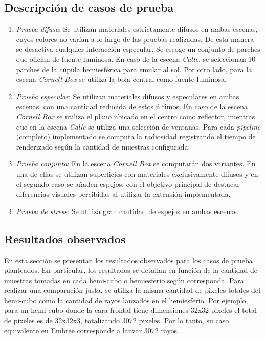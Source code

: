 \subsection{Descripción de casos de prueba}

\begin{enumerate}
	\item \textit{Prueba difusa}: Se utilizan materiales estrictamente difusos en ambas escenas, cuyos colores no varían a lo largo de las pruebas realizadas. De esta manera se desactiva cualquier interacción especular. Se escoge un conjunto de parches que ofician de fuente luminosa. En caso de la escena \textit{Calle}, se seleccionan 10 parches de la cúpula hemiesférica para emular al sol. Por otro lado, para la escena \textit{Cornell Box} se utiliza la bola central como fuente luminosa.
	\item \textit{Prueba especular}: Se utilizan materiales difusos y especulares en ambas escenas, con una cantidad reducida de estos últimos. En caso de la escena \textit{Cornell Box} se utiliza el plano ubicado en el centro como reflector, mientras que en la escena \textit{Calle} se utiliza una selección de ventanas. Para cada \textit{pipeline} (completo) implementado se computa la radiosidad registrando el tiempo de renderizado según la cantidad de muestras configurada.
	\item \textit{Prueba conjunta}: En la escena \textit{Cornell Box} se computarán dos variantes. En una de ellas se utilizan superficies con materiales exclusivamente difusos y en el segundo caso se añaden espejos, con el objetivo principal de destacar diferencias visuales percibidas al utilizar la extensión implementada.
	\item \textit{Prueba de stress}: Se utiliza gran cantidad de espejos en ambas escenas.
\end{enumerate}

\subsection{Resultados observados}

En esta sección se presentan los resultados observados para los casos de prueba planteados. En particular, los resultados se detallan en función de la cantidad de muestras tomadas en cada hemi-cubo o hemiesferio según corresponda. Para realizar una comparación justa, se utiliza la misma cantidad de pixeles totales del hemi-cubo como la cantidad de rayos lanzados en el hemiesferio. Por ejemplo, para un hemi-cubo donde la cara frontal tiene dimensiones 32x32 pixeles el total de pixeles es de 32x32x3, totalizando 3072 pixeles. Por lo tanto, su caso equivalente en Embree corresponde a lanzar 3072 rayos.

